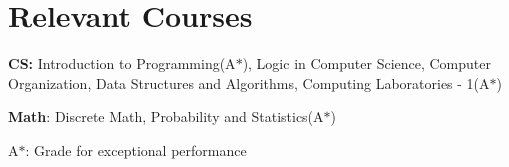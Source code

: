 \section*{\sc Relevant Courses}
\vspace{-2mm}
\hrulefill
\vspace{.2cm}

\textbf{CS:} Introduction to Programming(A$*$), Logic in Computer
Science, Computer Organization, Data Structures and Algorithms, Computing
Laboratories - 1(A$*$)


\textbf{Math}: Discrete Math, Probability and Statistics(A$*$)


{\footnotesize
    {A$*$: Grade for exceptional performance}
}
\vspace{0.5cm}

